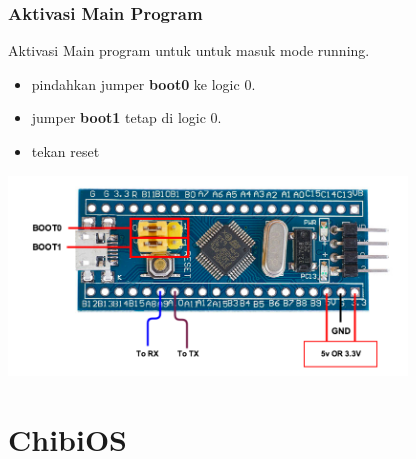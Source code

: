 \documentclass[table,dvipsnames]{beamer}
\begin{document}
	\begin{frame}
		\frametitle{Aktivasi Main Program}
		\begin{exampleblock}{}
			Aktivasi Main program untuk untuk masuk mode running.
			\begin{itemize}
				\item pindahkan jumper \textbf{boot0} ke logic 0.
				\item jumper \textbf{boot1} tetap di logic 0.
				\item tekan reset
			\end{itemize}
		\end{exampleblock}

		\begin{center}
			\includegraphics[width=300pt]{images/flashing}
		\end{center}
	\end{frame}

	\section{ChibiOS}
\end{document}
